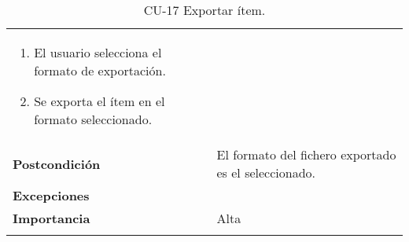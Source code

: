\begin{longtable}[]{@{}ll@{}}
\begin{minipage}[t]{0.69\columnwidth}
\begin{enumerate}
\tightlist
\item
  El usuario selecciona el formato de exportación.
\item
  Se exporta el ítem en el formato seleccionado.
\end{enumerate}\strut
\end{minipage}\tabularnewline
\begin{minipage}[t]{0.25\columnwidth}\raggedright
\textbf{Postcondición}\strut
\end{minipage} & \begin{minipage}[t]{0.69\columnwidth}\raggedright
El formato del fichero exportado es el seleccionado.\strut
\end{minipage}\tabularnewline
\begin{minipage}[t]{0.25\columnwidth}\raggedright
\textbf{Excepciones}\strut
\end{minipage} & \begin{minipage}[t]{0.69\columnwidth}\raggedright
\strut
\end{minipage}\tabularnewline
\begin{minipage}[t]{0.25\columnwidth}\raggedright
\textbf{Importancia}\strut
\end{minipage} & \begin{minipage}[t]{0.69\columnwidth}\raggedright
Alta\strut
\end{minipage}\tabularnewline
\bottomrule
\caption{CU-17 Exportar ítem.}
\end{longtable}

